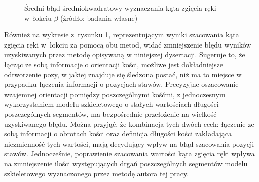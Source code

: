 																															
\begin{savenotes}
	\begin{figure}[!htb]
		\centering
		\caption{Średni błąd średniokwadratowy wyznaczania kąta zgięcia ręki w~łokciu $\beta$ (źródło: badania własne)}
		\label{fig:experiments:angle:summary}
	\end{figure}
\end{savenotes}


Również na wykresie z~rysunku \ref{fig:experiments:angle:summary}, reprezentującym wyniki szacowania kąta zgięcia ręki w~łokciu za pomocą obu metod, widać zmniejszenie błędu wyników uzyskiwanych przez metodę opisywaną w niniejszej dysertacji. Sugeruje to, że łącząc ze sobą informacje o orientacji kości, możliwe jest dokładniejsze odtworzenie pozy, w jakiej znajduje się śledzona postać, niż ma to miejsce w przypadku łączenia informacji o pozycjach stawów. Precyzyjne oszacowanie wzajemnej orientacji pomiędzy poszczególnymi kośćmi, z jednoczesnym wykorzystaniem modelu szkieletowego o stałych wartościach długości poszczególnych segmentów, ma bezpośrednie przełożenie na wielkość uzyskiwanego błędu. Można przyjąć, że kombinacja tych dwóch cech: łączenie ze sobą informacji o obrotach kości oraz definicja długości kości zakładająca niezmienność tych wartości, mają decydujący wpływ na błąd szacowania pozycji stawów. Jednocześnie, poprawienie szacowania wartości kąta zgięcia ręki wpływa na zmniejszenie ilości występujących drgań poszczególnych segmentów modelu szkieletowego wyznaczonego przez metodę autora tej pracy.